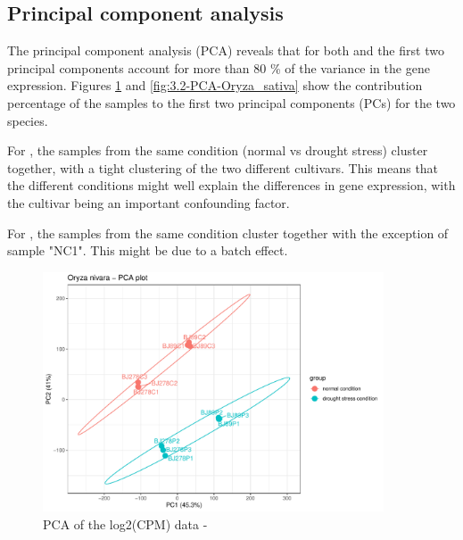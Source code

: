 \subsection{Principal component analysis}

The principal component analysis (PCA) reveals that for both  and  the first two principal components account for more than 80 \% of the variance in the gene expression. Figures  \ref{fig:3.2-PCA-Oryza_nivara} and \ref{fig:3.2-PCA-Oryza_sativa} show the contribution percentage of the samples to the first two principal components (PCs) for the two species.

For , the samples from the same condition (normal vs drought stress) cluster together, with a tight clustering of the two different cultivars. This means that the different conditions might well explain the differences in gene expression, with the cultivar being an important confounding factor.

For , the samples from the same condition cluster together with the exception of sample "NC1". This might be due to a batch effect.

\begin{figure}[htbp]
    \caption{PCA of the log2(CPM) data - }
    \label{fig:3.2-PCA-Oryza_nivara}
    \includegraphics[width=0.9\textwidth]{../../results/plots-and-tables/3.2-PCA-Oryza_nivara}
\end{figure}

